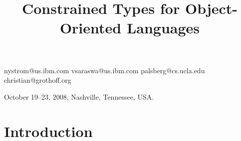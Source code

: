 \documentclass[10pt]{sigplanconf}
\newif\iflncs
\newif\iflstworks
\begin{document}
\iflncs
\title{Constrained Types for Object-Oriented Languages}
\titlerunning{Constrained Types}

\author{Nathaniel Nystrom\inst{1} \and Vijay Saraswat\inst{1}
\and Jens Palsberg\inst{2} \and Christian Grothoff\inst{3}}
\authorrunning{Vijay Saraswat et al.}

\institute{IBM T.~J. Watson Research~Center, P.O.~Box~704, Yorktown~Heights NY 10598 USA,
\email{\{nystrom,vsaraswa\}@us.ibm.com}
\and
UCLA~Computer~Science~Department,
Boelter~Hall, Los~Angeles CA 90095 USA,
\email{palsberg@cs.ucla.edu}
\and
Department~of~Computer~Science, University~of~Denver,
2360~S.~Gaylord~Street, John~Green~Hall, Room~214, Denver~CO, 80208 USA,
\email{christian@grothoff.org}}

\else

\title{Constrained Types for Object-Oriented Languages}
  {nystrom@us.ibm.com}
  {vsaraswa@us.ibm.com}
  {palsberg@cs.ucla.edu}
  {christian@grothoff.org}

 {October 19--23, 2008, Nashville,
Tennessee, USA.}

\fi

\maketitle

\begin{abstract}

\end{abstract}

\iflncs
\else
{}
\fi

\iflstworks
\section{Introduction}\label{sec:intro}

\end{document}
